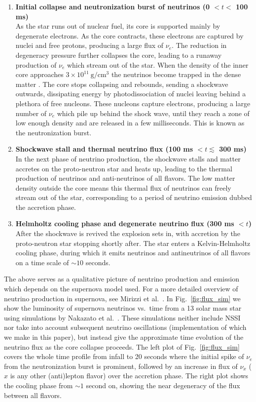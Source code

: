 \documentclass[a4paper,12pt]{article}
\newcommand\descitem[1]{\item{\bfseries #1}\\}
\begin{document}
\begin{enumerate}
\descitem {Initial collapse and neutronization burst of neutrinos (0 $< t <$ 100 ms)} As the star runs out of nuclear fuel, its core is supported mainly by degenerate electrons. As the core contracts, these electrons are captured by nuclei and free protons, producing a large flux of $\nu_{e}$. The reduction in degeneracy pressure further collapses the core, leading to a runaway production of $\nu_{e}$ which stream out of the star. When the density of the inner core approaches $3\times10^{11}\ \text{g}/\text{cm}^{3}$ the neutrinos become trapped in the dense matter \cite{Nbook}. The core stops collapsing and rebounds, sending a shockwave outwards, dissipating energy by photodissociation of nuclei leaving behind a plethora of free nucleons. These nucleons capture electrons, producing a large number of $\nu_{e}$ which pile up behind the shock wave, until they reach a zone of low enough density and are released in a few milliseconds. This is known as the neutronization burst.
\descitem{Shockwave stall and thermal neutrino flux (100 ms $< t \lesssim$ 300 ms)} In the next phase of neutrino production, the shockwave stalls and matter accretes on the proto-neutron star and heats up, leading to the thermal production of neutrinos and anti-neutrinos of all flavors. The low matter density outside the core means this thermal flux of neutrinos can freely stream out of the star, corresponding to a period of neutrino emission dubbed the accretion phase.
\descitem{Helmholtz cooling phase and degenerate neutrino flux (300 ms $< t$)} After the shockwave is revived the explosion sets in, with accretion by the proto-neutron star stopping shortly after. The star enters a Kelvin-Helmholtz cooling phase, during which it emits neutrinos and antineutrinos of all flavors on a time scale of $\sim 10$ seconds. 
\end{enumerate}
The above serves as a qualitative picture of neutrino production and emission which depends on the supernova model used. For a more detailed overview of neutrino production in supernova, see Mirizzi et al.\ \cite{Mirizzi:2015eza}. In Fig.~\ref{fig:flux_sim} we show the luminosity of supernova neutrinos vs.\ time from a 13 solar mass star using simulations by Nakazato et al.\ \cite{Nakazato:2012qf}. These simulations neither include NSSI nor take into account subsequent neutrino oscillations (implementation of which we make in this paper), but instead give the approximate time evolution of the neutrino flux as the core collapse proceeds. The left plot of Fig.~\ref{fig:flux_sim} covers the whole time profile from infall to 20 seconds where the initial spike of $\nu_{e}$ from the neutronization burst is prominent, followed by an increase in flux of $\nu_{x}$ ($x$ is any other (anti)lepton flavor) over the accretion phase. The right plot shows the cooling phase from $\sim 1$ second on, showing the near degeneracy of the flux between all flavors.  
\end{document}
